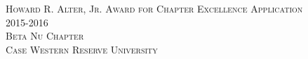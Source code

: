 \documentclass[oneside,openany]{book}
\begin{document}
  \begin{titlepage}
    \begin{center}
      \textsc{\Huge Howard R. Alter, Jr. Award for Chapter Excellence Application } \\[0.5cm]
      \textsc{\Huge 2015-2016} \\[1.0cm]
      \textsc{\Large Beta Nu Chapter} \\[0.3cm]
      \textsc{\Large Case Western Reserve University} \\[4.0cm]
    \end{center}
  \end{titlepage}

  \tableofcontents

  \frontmatter
    

  \mainmatter
    
    
    
    
    
\end{document}
